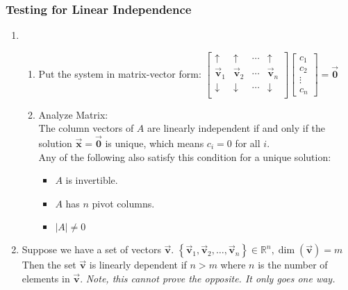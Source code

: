 \documentclass[12pt,landscape,twocolumn]{article}
\let\oldvec\vec
\renewcommand{\vec}[1]{\oldvec{\mathbf{ #1 } } }                    %
\begin{document}
        \subsubsection{Testing for Linear Independence}
        \begin{enumerate}
        \item \begin{enumerate}
            \item Put the system in matrix-vector form:
                $
                \left[ \begin{array}{cccc}
                    \uparrow & \uparrow & \cdots & \uparrow\\
                    \vec{v}_1 & \vec{v}_2 & \cdots & \vec{v}_n\\
                    \downarrow & \downarrow & \cdots & \downarrow\\
                \end{array} \right] \left[ \begin{array}{c}
                    c_1\\
                    c_2\\
                    \vdots\\
                    c_n
                \end{array}\right] = \vec{0}
                $
            \item Analyze Matrix:\\
                The column vectors of $A$ are linearly independent if and only if the solution $\vec{x} = \vec{0}$ is unique, which means $c_i = 0$ for all $i$.\\
                Any of the following also satisfy this condition for a unique solution:
                    \begin{itemize}
                        \item $A$ is invertible.
                        \item $A$ has $n$ pivot columns.
                        \item $|A| \neq 0$
                    \end{itemize}
            \end{enumerate}
        \item Suppose we have a set of vectors $\vec{v}$.
            $
                \left\{ \vec{v}_1, \vec{v}_2, \ldots, \vec{v}_n \right\} \in \mathbb{R}^n, \dim(\vec{v})=m
            $
            Then the set $\vec{v}$ is linearly dependent if $n>m$ where $n$ is the number of elements in $\vec{v}$. \textit{Note, this cannot prove the opposite. It only goes one way.}

\end{enumerate}
\end{document}
